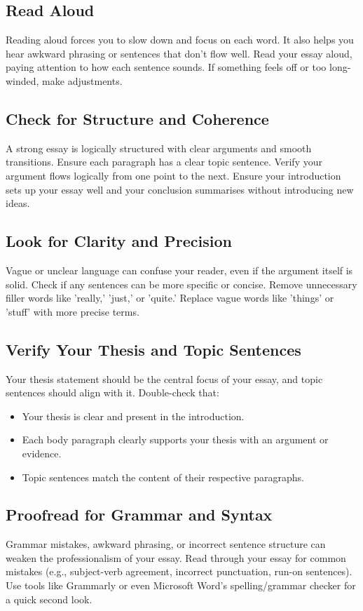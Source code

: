 \documentclass[a4paper]{article}
\begin{document}
\subsection{Read Aloud}
Reading aloud forces you to slow down and focus on each word. It also helps you hear awkward phrasing or sentences that don’t flow well. Read your essay aloud, paying attention to how each sentence sounds. If something feels off or too long-winded, make adjustments.

\subsection{Check for Structure and Coherence}
A strong essay is logically structured with clear arguments and smooth transitions. Ensure each paragraph has a clear topic sentence. Verify your argument flows logically from one point to the next. Ensure your introduction sets up your essay well and your conclusion summarises without introducing new ideas.

\subsection{Look for Clarity and Precision}
Vague or unclear language can confuse your reader, even if the argument itself is solid. Check if any sentences can be more specific or concise. Remove unnecessary filler words like 'really,' 'just,' or 'quite.' Replace vague words like 'things' or 'stuff' with more precise terms.

\subsection{Verify Your Thesis and Topic Sentences}
Your thesis statement should be the central focus of your essay, and topic sentences should align with it. Double-check that:
\begin{itemize}
    \item Your thesis is clear and present in the introduction.
    \item Each body paragraph clearly supports your thesis with an argument or evidence.
    \item Topic sentences match the content of their respective paragraphs.
\end{itemize}

\subsection{Proofread for Grammar and Syntax}
Grammar mistakes, awkward phrasing, or incorrect sentence structure can weaken the professionalism of your essay. Read through your essay for common mistakes (e.g., subject-verb agreement, incorrect punctuation, run-on sentences). Use tools like Grammarly or even Microsoft Word’s spelling/grammar checker for a quick second look.
\end{document}
